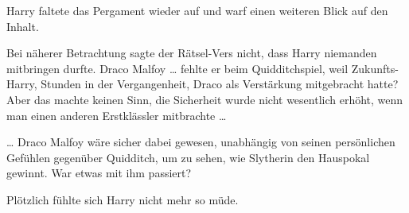 Harry faltete das Pergament wieder auf und warf einen weiteren Blick auf den Inhalt.

Bei näherer Betrachtung sagte der Rätsel-Vers nicht, dass Harry niemanden mitbringen durfte. Draco Malfoy … fehlte er beim Quidditchspiel, weil Zukunfts-Harry, Stunden in der Vergangenheit, Draco als Verstärkung mitgebracht hatte? Aber das machte keinen Sinn, die Sicherheit wurde nicht wesentlich erhöht, wenn man einen anderen Erstklässler mitbrachte …

… Draco Malfoy wäre sicher dabei gewesen, unabhängig von seinen persönlichen Gefühlen gegenüber Quidditch, um zu sehen, wie Slytherin den Hauspokal gewinnt. War etwas mit ihm passiert?

Plötzlich fühlte sich Harry nicht mehr so müde.



